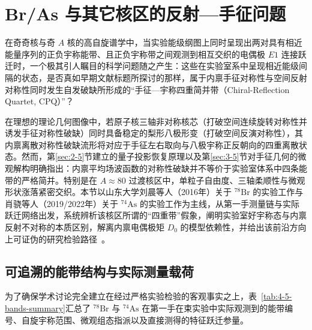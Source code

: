 \section{Br/As 与其它核区的反射---手征问题}\label{sec:4-5}

在奇奇核与奇 $A$ 核的高自旋谱学中，当实验能级纲图上同时呈现出两对具有相近能量序列的正负宇称能带、且正负宇称带之间观测到相互交织的电偶极 $E1$ 连接跃迁时，一个极其引人瞩目的科学问题随之产生：这些在实验室系中呈现相近能级间隔的状态，是否真如早期文献标题所探讨的那样，属于内禀手征对称性与空间反射对称性同时发生自发破缺所形成的“手征---宇称四重简并带（Chiral-Reflection Quartet, CPQ）”？

在理想的理论几何图像中，若原子核三轴非对称核芯（打破空间连续旋转对称性并诱发手征对称性破缺）同时具备稳定的梨形八极形变（打破空间反演对称性），其内禀离散对称性破缺流形将对应于手征左右取向与八极宇称正反朝向的四重离散状态。然而，第\ref{sec:2-5}节建立的量子投影恢复原理以及第\ref{sec:3-5}节对手征几何的微观解构明确指出：内禀平均场波函数的对称性破缺并不等价于实验室体系中四条能带的严格简并。特别是在 $A \approx 80$ 过渡核区中，单粒子自由度、三轴柔顺性与微观形状涨落紧密交织。本节以山东大学刘晨等人（2016年）关于 $^{78}\mathrm{Br}$ 的实验工作与肖骁等人（2019/2022年）关于 $^{74}\mathrm{As}$ 的实验工作为主线，从第一手测量链与实际跃迁网络出发，系统辨析该核区所谓的“四重带”假象，阐明实验室好宇称态与内禀反射不对称的本质区别，解离内禀电偶极矩 $D_0$ 的模型依赖性，并给出该前沿方向上可证伪的研究检验路径~\cite{liu-2016-octupole-correlations-multiple-chiral-doublet-bands-78br,liu-chen-2016-78br-chirality-reflection-symmetry-thesis,xiao-2022-chirality-octupole-correlations-74as,xiao-xiao-2019-high-spin-74as-thesis,butler-1996-octupole-shapes,wang-2019-rat-prm-78br-octupole-correlations}。

\subsection{可追溯的能带结构与实际测量载荷}\label{sec:4-5-1}

为了确保学术讨论完全建立在经过严格实验检验的客观事实之上，表~\ref{tab:4-5-bands-summary}汇总了 $^{78}\mathrm{Br}$ 与 $^{74}\mathrm{As}$ 在第一手在束实验中实际观测到的能带编号、自旋宇称范围、微观组态指派以及直接测得的特征跃迁参量。

